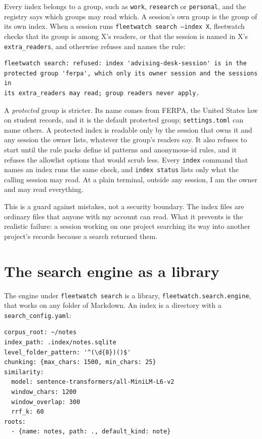 \documentclass[11pt, letterpaper]{article}
\newenvironment{code}{\par\smallskip\small}{\par\smallskip}
\newcommand{\cmd}[1]{\texttt{#1}}
\begin{document}
Every index belongs to a group, such as \cmd{work}, \cmd{research} or \cmd{personal}, and the
registry says which groups may read which. A session's own group is the group of its own
index. When a session runs \cmd{fleetwatch search --index X}, fleetwatch checks that its group
is among X's readers, or that the session is named in X's \cmd{extra\_readers}, and otherwise
refuses and names the rule:

\begin{code}
\begin{verbatim}
fleetwatch search: refused: index 'advising-desk-session' is in the
protected group 'ferpa', which only its owner session and the sessions in
its extra_readers may read; group readers never apply.
\end{verbatim}
\end{code}

A \emph{protected} group is stricter. Its name comes from FERPA, the United States law on
student records, and it is the default protected group; \cmd{settings.toml} can name others.
A protected index is readable only by the session that owns it and any session the owner
lists, whatever the group's readers say. It also refuses to start until the rule packs define
id patterns and anonymous-id rules, and it refuses the allowlist options that would scrub
less. Every \cmd{index} command that names an index runs the same check, and \cmd{index
status} lists only what the calling session may read. At a plain terminal, outside any
session, I am the owner and may read everything.

This is a guard against mistakes, not a security boundary. The index files are ordinary
files that anyone with my account can read. What it prevents is the realistic failure: a
session working on one project searching its way into another project's records because a
search returned them.

\section{The search engine as a library}\label{sec:library}

The engine under \cmd{fleetwatch search} is a library, \cmd{fleetwatch.search.engine}, that
works on any folder of Markdown. An index is a directory with a \cmd{search\_config.yaml}:

\begin{code}
\begin{verbatim}
corpus_root: ~/notes
index_path: .index/notes.sqlite
level_folder_pattern: '^(\d{8})()$'
chunking: {max_chars: 1500, min_chars: 25}
similarity:
  model: sentence-transformers/all-MiniLM-L6-v2
  window_chars: 1200
  window_overlap: 300
  rrf_k: 60
roots:
  - {name: notes, path: ., default_kind: note}
\end{verbatim}
\end{code}
\end{document}
